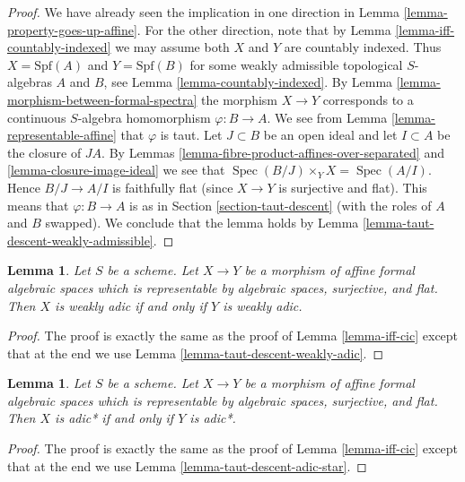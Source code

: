 \documentclass{stacks-project}
\theoremstyle{plain}
\newtheorem{lemma}[subsection]{Lemma}
\theoremstyle{definition}
\theoremstyle{remark}
\numberwithin{equation}{subsection}
\def\Spec{\mathop{\mathrm{Spec}}}
\begin{document}
\begin{proof}
We have already seen the implication in one direction in
Lemma \ref{lemma-property-goes-up-affine}. For the other direction,
note that by Lemma \ref{lemma-iff-countably-indexed} we may assume
both $X$ and $Y$ are countably indexed. Thus $X = \text{Spf}(A)$
and $Y = \text{Spf}(B)$ for some weakly admissible topological
$S$-algebras $A$ and $B$, see Lemma \ref{lemma-countably-indexed}.
By Lemma \ref{lemma-morphism-between-formal-spectra}
the morphism $X \to Y$ corresponds to a continuous $S$-algebra
homomorphism $\varphi : B \to A$. We see from
Lemma \ref{lemma-representable-affine} that $\varphi$ is taut.
Let $J \subset B$ be an open ideal and let $I \subset A$
be the closure of $JA$. By
Lemmas \ref{lemma-fibre-product-affines-over-separated} and
\ref{lemma-closure-image-ideal}
we see that $\Spec(B/J) \times_Y X = \Spec(A/I)$.
Hence $B/J \to A/I$ is faithfully flat (since $X \to Y$ is surjective
and flat). This means that $\varphi : B \to A$ is as in
Section \ref{section-taut-descent} (with the roles of $A$ and $B$ swapped).
We conclude that the lemma holds by
Lemma \ref{lemma-taut-descent-weakly-admissible}.
\end{proof}

\begin{lemma}
\label{lemma-iff-weakly-adic}
Let $S$ be a scheme. Let $X \to Y$ be a morphism of affine
formal algebraic spaces which is representable by algebraic spaces,
surjective, and flat. Then $X$ is weakly adic
if and only if $Y$ is weakly adic.
\end{lemma}

\begin{proof}
The proof is exactly the same as the proof of
Lemma \ref{lemma-iff-cic} except that at the end we use
Lemma \ref{lemma-taut-descent-weakly-adic}.
\end{proof}

\begin{lemma}
\label{lemma-iff-adic-star}
Let $S$ be a scheme. Let $X \to Y$ be a morphism of affine
formal algebraic spaces which is representable by algebraic spaces,
surjective, and flat. Then $X$ is adic* if and only if $Y$ is adic*.
\end{lemma}

\begin{proof}
The proof is exactly the same as the proof of
Lemma \ref{lemma-iff-cic} except that at the end we use
Lemma \ref{lemma-taut-descent-adic-star}.
\end{proof}
\end{document}
